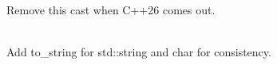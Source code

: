 \begin{DoxyRefList}
\label{todo__todo000006}%
%
Remove this cast when C++26 comes out.  
\item[Member \doxylink{namespaceauspicious__library_1_1sm_a557e590ecf315060dbbe49015d5e90fb}{auspicious\+\_\+library\+::sm\+::word\+\_\+wrap} (std\+::string\+\_\+view string, std\+::size\+\_\+t width, bool force=false, std\+::string\+\_\+view delims="{} \textbackslash{}\textbackslash{}t\textbackslash{}\textbackslash{}r\textbackslash{}\textbackslash{}n\textbackslash{}\textbackslash{}f\textbackslash{}\textbackslash{}v\textbackslash{}\textbackslash{}b"{})]\hfill \\
\label{todo__todo000007}%
%
Add to\+\_\+string for std\+::string and char for consistency. 
\end{DoxyRefList}